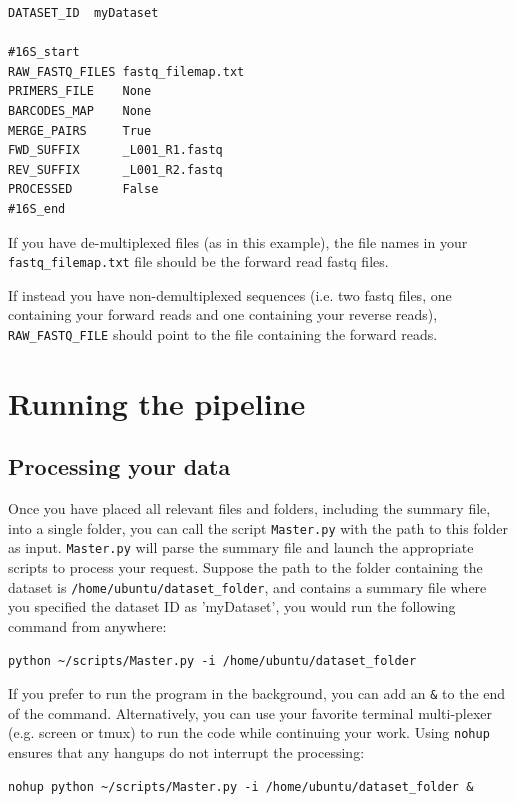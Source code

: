 \documentclass[11pt, oneside]{article}   	%
\begin{document}
\begin{verbatim}
DATASET_ID	myDataset

#16S_start
RAW_FASTQ_FILES fastq_filemap.txt
PRIMERS_FILE    None
BARCODES_MAP    None
MERGE_PAIRS	    True
FWD_SUFFIX      _L001_R1.fastq
REV_SUFFIX      _L001_R2.fastq
PROCESSED       False
#16S_end
\end{verbatim}

If you have de-multiplexed files (as in this example), the file names in your 
{\tt fastq\_filemap.txt} file should be the forward read fastq files.

If instead you have non-demultiplexed sequences (i.e. two fastq files, one containing your
forward reads and one containing your reverse reads), {\tt RAW\_FASTQ\_FILE} should point
to the file containing the forward reads.

\section{Running the pipeline}

\subsection{Processing your data}
Once you have placed all relevant files and folders, including the summary file, into a single folder, you can call the script {\tt Master.py} with the path to this folder as input.  {\tt Master.py} will parse the summary file and launch the appropriate scripts to process your request.  Suppose the path to the folder containing the dataset is {\tt /home/ubuntu/dataset\_folder}, and contains a summary file where you specified the dataset ID as 'myDataset', you would run the following command from anywhere:
\begin{verbatim}
python ~/scripts/Master.py -i /home/ubuntu/dataset_folder
\end{verbatim}

If you prefer to run the program in the background, you can add an {\tt \&} to 
the end of the command. Alternatively, you can use your favorite terminal
multi-plexer (e.g. screen or tmux) to run the code while continuing your work.
Using {\tt nohup} ensures that any hangups do not interrupt the processing:

\begin{verbatim}
nohup python ~/scripts/Master.py -i /home/ubuntu/dataset_folder &
\end{verbatim}
\end{document}

